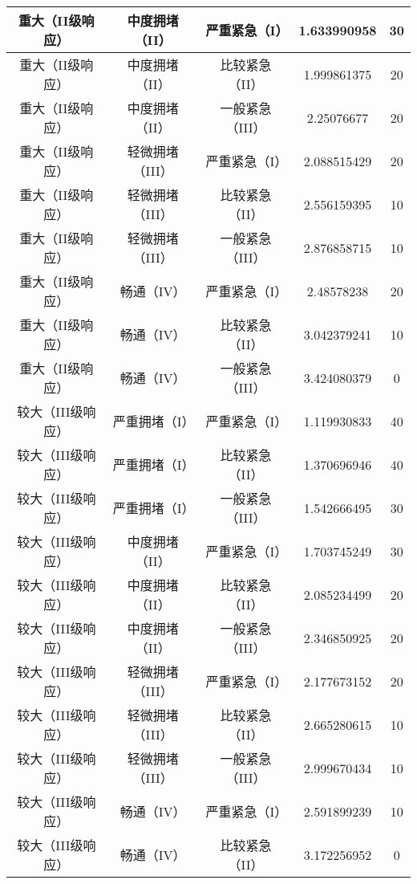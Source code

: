 \begin{center}
\begin{longtable}{|c|c|c|c|c|}
		重大（II级响应）&   中度拥堵（II）&	 严重紧急（I）	      &  1.633990958	 & 30 \\ \hline
		重大（II级响应）&   中度拥堵（II）&	 比较紧急（II）      &  	1.999861375	 & 20\\ \hline
		重大（II级响应）&   中度拥堵（II）&	 一般紧急（III）      &  	2.25076677	 & 20\\ \hline
		重大（II级响应）&   轻微拥堵（III）&	 严重紧急（I）      &  	2.088515429	 & 20\\ \hline
		重大（II级响应）&   轻微拥堵（III）&	 比较紧急（II）      &  	2.556159395	 & 10\\ \hline
		重大（II级响应）&   轻微拥堵（III）&	 一般紧急（III）      & 	2.876858715	 & 10\\ \hline
		重大（II级响应）&   畅通（IV）&	  严重紧急（I）	       &   2.48578238   & 20\\ \hline
		重大（II级响应）&   畅通（IV）&	  比较紧急（II）	      &    3.042379241  & 10\\ \hline
		重大（II级响应）&   畅通（IV）&	  一般紧急（III）      &  	  3.424080379 &  0\\ \hline
		较大（III级响应）&  严重拥堵（I）&   严重紧急（I）	      &      1.119930833	 & 40\\ \hline
		较大（III级响应）&  严重拥堵（I）&   比较紧急（II）      &  	1.370696946	 & 40\\ \hline
		较大（III级响应）&  严重拥堵（I）&   一般紧急（III）      &  	1.542666495	 & 30\\ \hline
		较大（III级响应）&  中度拥堵（II）& 	严重紧急（I）	      &      1.703745249	 & 30\\ \hline
		较大（III级响应）&  中度拥堵（II）& 	比较紧急（II）      &  	2.085234499	 & 20\\ \hline
		较大（III级响应）&  中度拥堵（II）& 	一般紧急（III）      & 	2.346850925	 & 20\\ \hline
		较大（III级响应）&  轻微拥堵（III）&	严重紧急（I）	      &      2.177673152	 & 20\\ \hline
		较大（III级响应）&  轻微拥堵（III）&	比较紧急（II）      &  	2.665280615	 & 10\\ \hline
		较大（III级响应）&  轻微拥堵（III）&	一般紧急（III）      &  	2.999670434	 & 10\\ \hline
		较大（III级响应）&  畅通（IV）&	 严重紧急（I）	        &  2.591899239  & 10\\ \hline
		较大（III级响应）&  畅通（IV）&	 比较紧急（II）	       &   3.172256952 &  0\\ \hline

\end{longtable}
\end{center}
